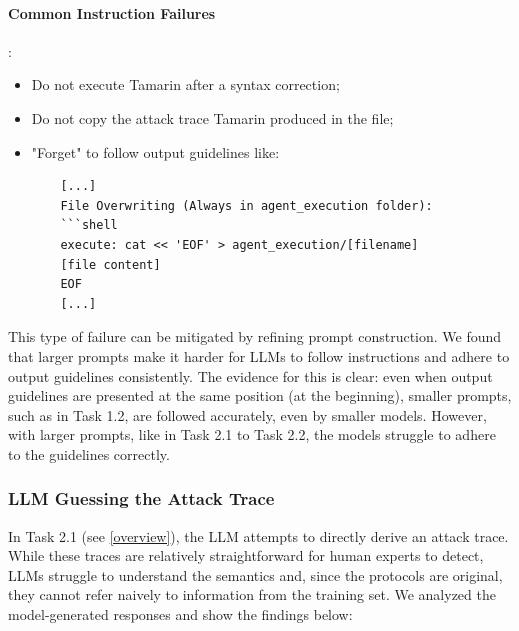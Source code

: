 \paragraph{Common Instruction Failures}:
\label{common_instructions_failures}

\begin{itemize}
    \item Do not execute Tamarin after a syntax correction;
    \item Do not copy the attack trace Tamarin produced in the file;
    \item "Forget" to follow output guidelines like:
    \begin{verbatim}
    [...]
    File Overwriting (Always in agent_execution folder):
    ```shell
    execute: cat << 'EOF' > agent_execution/[filename]
    [file content]
    EOF
    [...]
    \end{verbatim}
\end{itemize}
This type of failure can be mitigated by refining prompt construction. We found that larger prompts make it harder for LLMs to follow instructions and adhere to output guidelines consistently. The evidence for this is clear: even when output guidelines are presented at the same position (at the beginning), smaller prompts, such as in Task 1.2, are followed accurately, even by smaller models. However, with larger prompts, like in Task 2.1 to Task 2.2, the models struggle to adhere to the guidelines correctly.

\subsubsection{LLM Guessing the Attack Trace}  
In Task 2.1 (see \ref{overview}), the LLM attempts to directly derive an attack trace. While these traces are relatively straightforward for human experts to detect, LLMs struggle to understand the semantics and, since the protocols are original, they cannot refer naively to information from the training set. We analyzed the model-generated responses and show the findings below:

